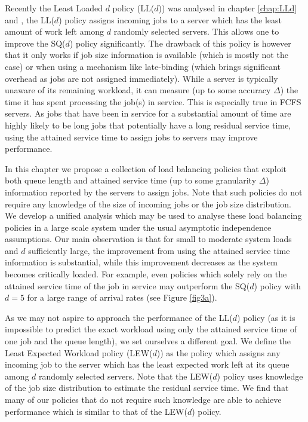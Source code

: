 \documentclass[12pt]{report}
\begin{document}
Recently the Least Loaded $d$ policy (LL($d$)) was analysed in chapter \ref{chap:LLd} and \cite{ayesta2018unifying}, the LL($d$) policy assigns incoming jobs to a server which has the least amount of work left
among $d$ randomly selected servers. This allows one to improve the SQ($d$) policy significantly. The drawback of this policy is however that it only works if job size information
is available (which is mostly not the case) or when using a mechanism like late-binding (which brings significant overhead as jobs are not assigned immediately). While a server is typically unaware of its remaining workload, it can measure (up to some accuracy $\Delta$) the time it has spent processing the job(s) in service. This is especially
true in FCFS servers. As jobs that have been in service for a substantial amount of time
 are highly likely to be long jobs that potentially have a long residual service time, using the attained service time to assign jobs to servers
may improve performance.  

In this chapter we propose a collection of load balancing policies that exploit both queue length
and attained service time (up to some granularity $\Delta$) information reported by the servers to assign jobs. Note that such policies do not require any knowledge of the size of incoming jobs or the job size distribution. We develop a unified analysis which may be used to analyse these load balancing policies in a large scale system under the usual asymptotic independence assumptions. Our main observation is that for small to moderate system loads and $d$ sufficiently large, the improvement from using the attained service time information is substantial, while this improvement decreases as the system becomes critically loaded. For example, even policies which solely rely on the attained service time of the job in service may outperform the SQ($d$) policy with $d=5$ for a large range of arrival rates (see Figure \ref{fig3a}).

As we may not aspire to approach the performance of the LL($d$) policy (as it is impossible to predict the exact workload using only the attained service time of one job and the queue length), we set ourselves a different goal. We define the Least Expected Workload policy (LEW($d$)) as the policy which assigns any incoming job to the server which has the least expected work left at its queue among $d$ randomly selected servers. Note that the LEW($d$) policy uses knowledge of the job size distribution to estimate the residual service time. We find that many of our policies that do not require such knowledge are able to achieve performance which is similar to that of the LEW($d$) policy.
\end{document}
